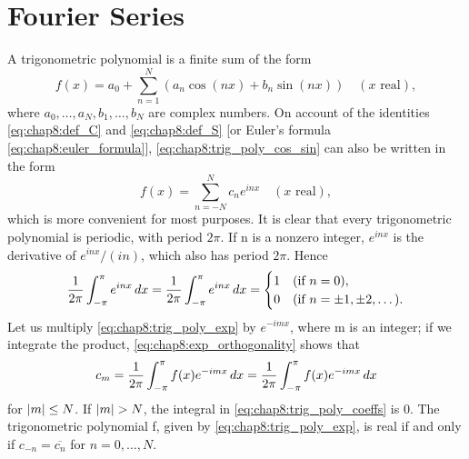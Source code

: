 \section{Fourier Series}
\label{sec:chap8:fourier_series}

\begin{definition} %
  \label{def:chap8:trig_poly_series}
  A trigonometric polynomial is a finite sum of the form
  \begin{equation} \label{eq:chap8:trig_poly_cos_sin}
    f(x) = a_0 + \sum_{n=1}^N (a_n \cos(nx) + b_n \sin(nx)) \quad (x
    \text{ real}),
  \end{equation}
  where $a_0, \dots, a_N, b_1, \dots, b_N$ are complex numbers. On
  account of the identities \eqref{eq:chap8:def_C} and
  \eqref{eq:chap8:def_S} [or Euler's formula
  \eqref{eq:chap8:euler_formula}], \eqref{eq:chap8:trig_poly_cos_sin}
  can also be written in the form
  \begin{equation} \label{eq:chap8:trig_poly_exp}
    f(x) = \sum_{n=-N}^N c_n e^{inx} \quad (x \text{ real}),
  \end{equation}
  which is more convenient for most purposes. It is clear that every
  trigonometric polynomial is periodic, with period $2\pi$.
  If n is a nonzero integer, $e^{inx}$ is the derivative of
  $e^{inx}/(in)$, which also has period $2\pi$. Hence
  \begin{equation} \label{eq:chap8:exp_orthogonality}
    \frac{1}{2\pi} \int_{-\pi}^{\pi} e^{inx} \, dx = \frac{1}{2\pi} \int_{-\pi}^{\pi} e^{inx} \, dx =
    \begin{cases} 1 & (\text{if } n=0), \\ 0 & (\text{if } n = \pm 1,
      \pm 2, \dots).
    \end{cases}
  \end{equation}
  Let us multiply \eqref{eq:chap8:trig_poly_exp} by $e^{-imx}$, where
  m is an integer; if we integrate the product,
  \eqref{eq:chap8:exp_orthogonality} shows that
  \begin{equation} \label{eq:chap8:trig_poly_coeffs}
    c_m = \frac{1}{2\pi} \int_{-\pi}^{\pi} f(x) e^{-imx} \, dx =
    \frac{1}{2\pi} \int_{-\pi}^{\pi} f(x) e^{-imx} \, dx
  \end{equation}
  for $\left\lvert m \right\rvert \le N$. If $\left\lvert m \right\rvert > N$, the integral in
  \eqref{eq:chap8:trig_poly_coeffs} is 0.
  The trigonometric polynomial f, given by
  \eqref{eq:chap8:trig_poly_exp}, is real if and only if $c_{-n} =
  \overline{c_n}$ for $n=0, \dots, N$.


\end{definition}
